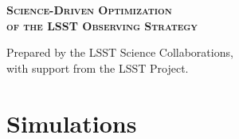 \documentclass[11pt,headsepline,cleardoubleempty,twoside,openright]{scrbook}
\begin{document}
\begin{titlepage}
\begin{center}


{\Huge\bfseries\scshape
 Science-Driven Optimization \\ \vspace{\baselineskip}
 of the LSST Observing Strategy}



{\Large  Prepared by the LSST Science Collaborations,}\\
{\Large with support from the LSST Project. }\\



\end{center}
\end{titlepage}


\clearemptydoublepage



\tableofcontents
\label{toc}


\clearemptydoublepage



\clearemptydoublepage







\part{Simulations}
\def\partname{sims}\label{part:\partname}
\end{document}
